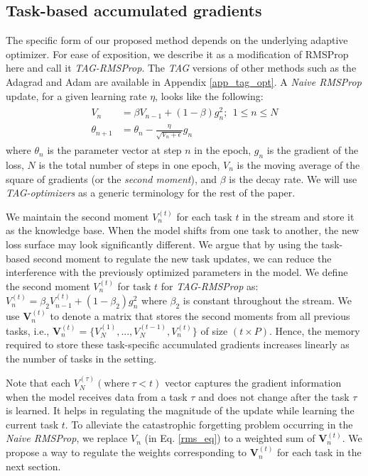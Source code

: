 \documentclass{article} \usepackage{collas2022_conference,times}
\begin{document}
\subsection{Task-based accumulated gradients}\label{tag_def_section}
The specific form of our proposed method depends on the underlying adaptive optimizer. For ease of exposition, we describe it as a modification of RMSProp \citep{rmsprop} here and call it \textit{TAG-RMSProp}. The \textit{TAG} versions of other methods such as the Adagrad \citep{duchi2011adaptive} and Adam are available in Appendix \ref{app_tag_opt}. A \textit{Naive RMSProp} update, for a given learning rate $\eta$, looks like the following:
     \begin{align} 
     \begin{split}
       V_n &= \beta V_{n-1} + (1-\beta)g^2_n ;~~1\leq n\leq N\\
        \theta_{n+1} &= \theta_n - \frac{\eta}{\sqrt{V_n + \epsilon}} g_n
    \end{split}\label{rms_eq}
    \end{align}
    where $\theta_n$ is the parameter vector at step $n$ in the epoch, $g_n$ is the gradient of the loss, $N$ is the total number of steps in one epoch, $V_n$ is the moving average of the square of gradients (or the \textit{second moment}), and $\beta$ is the decay rate. We will use \textit{TAG-optimizers} as a generic terminology for the rest of the paper. 
    
    We maintain the second moment $V^{(t)}_n$ for each task $t$ in the stream and store it as the knowledge base. When the model shifts from one task to another, the new loss surface may look significantly different. We argue that by using the task-based second moment to regulate the new task updates, we can reduce the interference with the previously optimized parameters in the model. 
We define the second moment $V^{(t)}_n$ for task $t$ for \textit{TAG-RMSProp} as:
$V^{(t)}_n = \beta_2 V^{(t)}_{n-1} + (1-\beta_2)g^2_n$  where $\beta_2$ is constant throughout the stream. We use $\textbf{V}^{(t)}_n$ to denote a matrix that stores the second moments from all previous tasks, i.e., $\textbf{V}^{(t)}_n = \{V^{(1)}_N, ..., V^{(t-1)}_N, V^{(t)}_n\}$ of size $(t \times P)$. Hence, the memory required to store these task-specific accumulated gradients increases linearly as the number of tasks in the setting. 


    Note that each $V^{(\tau)}_N (\text{where}~\tau<t)$ vector captures the gradient information when the model receives data from a task $\tau$ and does not change after the task $\tau$ is learned. It helps in regulating the magnitude of the update while learning the current task $t$. 
To alleviate the catastrophic forgetting problem occurring in the \textit{Naive RMSProp}, we replace $V_n$ (in Eq. \ref{rms_eq}) to a weighted sum of $\textbf{V}^{(t)}_n$. We propose a way to regulate the weights corresponding to $\textbf{V}^{(t)}_n$ for each task in the next section. 
\end{document}
